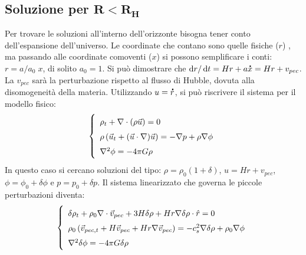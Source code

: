 \subsection{Soluzione per $\mathbf{R < R_H}$}\label{ch6:chilovoleva}
Per trovare le soluzioni all'interno dell'orizzonte bisogna tener conto dell'espansione dell'universo. Le coordinate che contano sono quelle fisiche ($r$) , ma passando alle coordinate comoventi ($x$) si possono semplificare i conti: $r=a/a_0 \; x$, di solito $a_0=1$. Si può dimostrare che $\operatorname{d}\!{r}/\operatorname{d}\!{t} = Hr + a\accentset{\mbox{\large\bfseries .}}{x} = Hr+ v_{pec}$. La $v_{pec}$ sarà la perturbazione rispetto al flusso di Hubble, dovuta alla disomogeneità della materia. Utilizzando $u=\accentset{\mbox{\large\bfseries .}}{r}$, si può riscrivere il sistema per il modello fisico:
\begin{equation}\left\{
    \def\arraystretch{1.5}
    \begin{array}{l}
        \rho_t + \nabla\cdot (\rho \vec{u}) =0 \\
        \rho \left ( \vec{u}_t + (\vec{u} \cdot \nabla) \vec{u} \right) = -\nabla p +\rho \nabla \phi \\
        \nabla^2 \phi = - 4 \pi G \rho
    \end{array}\right.
\end{equation}
In questo caso si cercano soluzioni del tipo: $\rho = \rho_0 (1+\delta)$, $u=Hr+v_{pec}$, $\phi=\phi_0+\delta\phi$ e $p=p_0+\delta p$. Il sistema linearizzato che governa le piccole perturbazioni diventa:
\begin{equation}\left\{
    \def\arraystretch{1.5}
    \begin{array}{l}
        \delta\rho_t + \rho_0 \nabla\cdot\vec{v}_{pec} + 3H \delta\rho + Hr \nabla \delta\rho \cdot \hat{r} =0 \\
        \rho_0 \left ( \vec{v}_{pec, t} + H \vec{v}_{pec}+ Hr\nabla\vec{v}_{pec}\right ) = -c_s^2 \nabla\delta\rho +\rho_0\nabla\phi \\
        \nabla^2 \delta \phi = -4\pi G \delta\rho
    \end{array}\right.
\end{equation}

